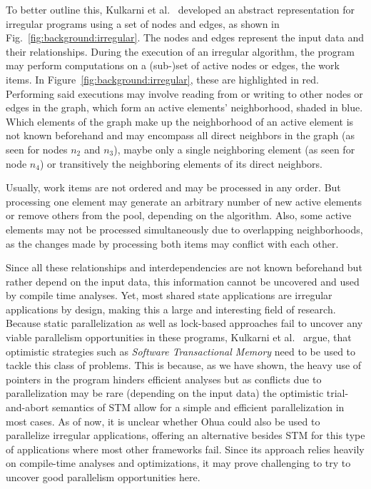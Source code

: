 To better outline this, Kulkarni et al.~\cite{kulkarni2009much} developed an abstract representation for irregular programs using a set of nodes and edges, as shown in Fig.~\ref{fig:background:irregular}.
The nodes and edges represent the input data and their relationships.
During the execution of an irregular algorithm, the program may perform computations on a (sub-)set of active nodes or edges, the work items.
In Figure~\ref{fig:background:irregular}, these are highlighted in red.
Performing said executions may involve reading from or writing to other nodes or edges in the graph, which form an active elements' neighborhood, shaded in blue.
Which elements of the graph make up the neighborhood of an active element is not known beforehand and may encompass all direct neighbors in the graph (as seen for nodes $n_2$ and $n_3$), maybe only a single neighboring element (as seen for node $n_4$) or transitively the neighboring elements of its direct neighbors.

Usually, work items are not ordered and may be processed in any order.
But processing one element may generate an arbitrary number of new active elements or remove others from the pool, depending on the algorithm.
Also, some active elements may not be processed simultaneously due to overlapping neighborhoods, as the changes made by processing both items may conflict with each other.

Since all these relationships and interdependencies are not known beforehand but rather depend on the input data, this information cannot be uncovered and used by compile time analyses.
Yet, most shared state applications are irregular applications by design, making this a large and interesting field of research.
Because static parallelization as well as lock-based approaches fail to uncover any viable parallelism opportunities in these programs, Kulkarni et al.~\cite{kulkarni2007optimistic} argue, that optimistic strategies such as \emph{Software Transactional Memory} need to be used to tackle this class of problems.
This is because, as we have shown, the heavy use of pointers in the program hinders efficient analyses but as conflicts due to parallelization may be rare (depending on the input data) the optimistic trial-and-abort semantics of STM allow for a simple and efficient parallelization in most cases.
As of now, it is unclear whether Ohua could also be used to parallelize irregular applications, offering an alternative besides STM for this type of applications where most other frameworks fail.
Since its approach relies heavily on compile-time analyses and optimizations, it may prove challenging to try to uncover good parallelism opportunities here.


